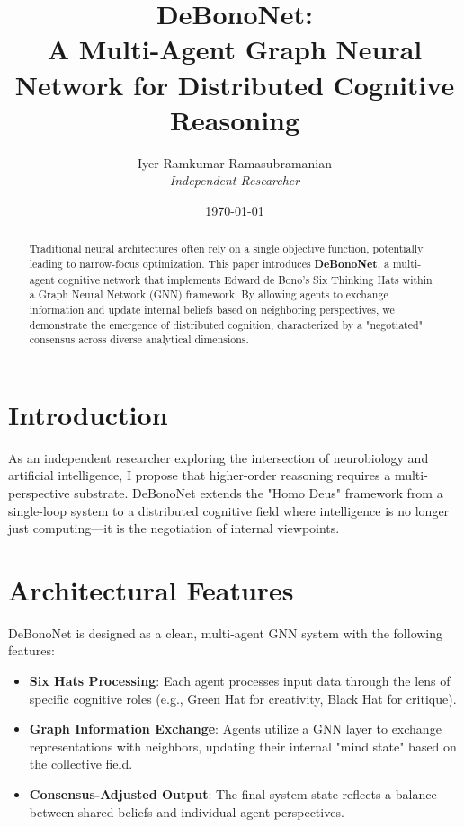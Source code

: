 \documentclass[12pt]{article}
\title{\textbf{DeBonoNet: \\ A Multi-Agent Graph Neural Network for Distributed Cognitive Reasoning}}
\author{Iyer Ramkumar Ramasubramanian \\ \textit{Independent Researcher}}
\date{\today}
\begin{document}
\maketitle

\begin{abstract}
Traditional neural architectures often rely on a single objective function, potentially leading to narrow-focus optimization. This paper introduces \textbf{DeBonoNet}, a multi-agent cognitive network that implements Edward de Bono's Six Thinking Hats within a Graph Neural Network (GNN) framework. By allowing agents to exchange information and update internal beliefs based on neighboring perspectives, we demonstrate the emergence of distributed cognition, characterized by a "negotiated" consensus across diverse analytical dimensions.
\end{abstract}

\section{Introduction}
As an independent researcher exploring the intersection of neurobiology and artificial intelligence, I propose that higher-order reasoning requires a multi-perspective substrate. DeBonoNet extends the "Homo Deus" framework from a single-loop system to a distributed cognitive field where intelligence is no longer just computing—it is the negotiation of internal viewpoints.

\section{Architectural Features}

DeBonoNet is designed as a clean, multi-agent GNN system with the following features:

\begin{itemize}
\item \textbf{Six Hats Processing}: Each agent processes input data through the lens of specific cognitive roles (e.g., Green Hat for creativity, Black Hat for critique).
\item \textbf{Graph Information Exchange}: Agents utilize a GNN layer to exchange representations with neighbors, updating their internal "mind state" based on the collective field.
\item \textbf{Consensus-Adjusted Output}: The final system state reflects a balance between shared beliefs and individual agent perspectives.
\end{itemize}
\end{document}
